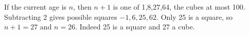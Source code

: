 If the current age is $n$, then $n+1$ is one of 1,8,27,64, the cubes at most 100. Subtracting 2 gives possible squares $-1,6,25,62$. Only 25 is a square, so $n+1=27$ and $\boxed{n=26}$. Indeed 25 is a square and 27 a cube.
